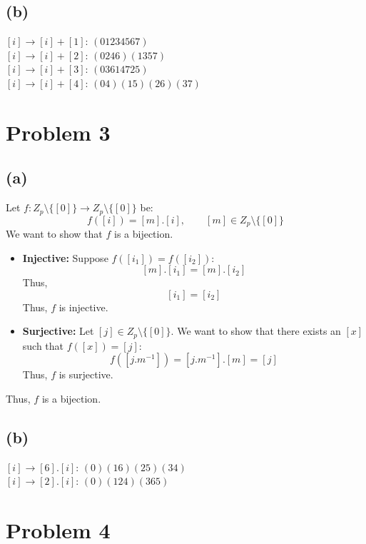 \documentclass{article}
\begin{document}
\subsection*{(b)}
\([i] \rightarrow [i] + [1]\):
\(
   (01234567)
\)
\\
\([i] \rightarrow [i] + [2]\):
\(
   (0246)(1357)
\)
\\
\([i] \rightarrow [i] + [3]\):
\(
   (03614725)
\)
\\
\([i] \rightarrow [i] + [4]\):
\(
   (04)(15)(26)(37)
\)

\section*{Problem 3}


\subsection*{(a)}

Let \(f: Z_p \setminus \{[0]\} \to Z_p \setminus \{[0]\}\) be:
\[
   f([i]) = [m].[i], \qquad [m] \in Z_p \setminus \{[0]\}
\]
We want to show that \(f\) is a bijection.
\begin{itemize}
   \item \textbf{Injective:} Suppose \(f([i_1]) = f([i_2])\):
   \[
      [m].[i_1] = [m].[i_2]
   \]
   Thus,
   \[
      [i_1] = [i_2]
   \]
   Thus, \(f\) is injective.
   \item \textbf{Surjective:} Let \([j] \in Z_p \setminus \{[0]\}\). We want to show that there exists an \([x]\) such that \(f([x]) = [j]\):
   \[
      f([j . m^{-1}]) = [j . m^{-1}] . [m] = [j]
   \]
   Thus, \(f\) is surjective.
\end{itemize}
Thus, \(f\) is a bijection.

\subsection*{(b)}
\([i] \rightarrow [6].[i]\):
\(
   (0)(16)(25)(34)
\)
\\
\([i] \rightarrow [2].[i]\):
\(
   (0)(124)(365)
\)

\section*{Problem 4}
\end{document}
